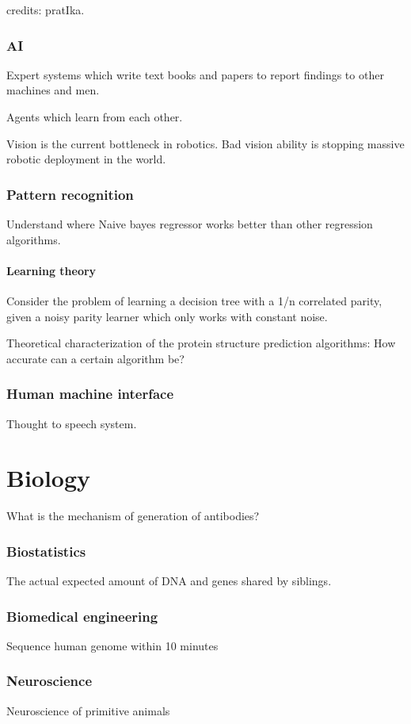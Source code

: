 \documentclass{article}
\begin{document}
credits: pratIka.



\section{AI}
Expert systems which write text books and papers to report findings to other machines and men.

Agents which learn from each other.

Vision is the current bottleneck in robotics. Bad vision ability is stopping massive robotic deployment in the world.

\section{Pattern recognition}
Understand where Naive bayes regressor works better than other regression algorithms.

\subsection{Learning theory}
Consider the problem of learning a decision tree with a 1/n correlated parity, given a noisy parity learner which only works with constant noise.

Theoretical characterization of the protein structure prediction algorithms: How accurate can a certain algorithm be?

\section{Human machine interface}
Thought to speech system.

\part{Biology}
What is the mechanism of generation of antibodies?

\section{Biostatistics}
The actual expected amount of DNA and genes shared by siblings.

\section{Biomedical engineering}
Sequence human genome within 10 minutes

\section{Neuroscience}
Neuroscience of primitive animals
\end{document}
